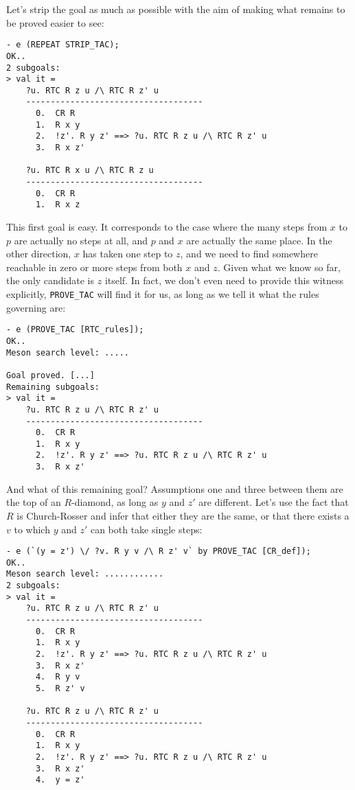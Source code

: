 \documentclass[12pt]{article}
\begin{document}
Let's strip the goal as much as possible with the aim of making what
remains to be proved easier to see:
\begin{session}\begin{verbatim}
- e (REPEAT STRIP_TAC);
OK..
2 subgoals:
> val it =
    ?u. RTC R z u /\ RTC R z' u
    ------------------------------------
      0.  CR R
      1.  R x y
      2.  !z'. R y z' ==> ?u. RTC R z u /\ RTC R z' u
      3.  R x z'

    ?u. RTC R x u /\ RTC R z u
    ------------------------------------
      0.  CR R
      1.  R x z
\end{verbatim}\end{session}
This first goal is easy.  It corresponds to the case where the many
steps from $x$ to $p$ are actually no steps at all, and $p$ and $x$
are actually the same place.  In the other direction, $x$ has taken
one step to $z$, and we need to find somewhere reachable in zero or
more steps from both $x$ and $z$.  Given what we know so far, the only
candidate is $z$ itself.  In fact, we don't even need to provide this
witness explicitly, \texttt{PROVE\_TAC} will find it for us, as long
as we tell it what the rules governing  are:
\begin{session}\begin{verbatim}
- e (PROVE_TAC [RTC_rules]);
OK..
Meson search level: .....

Goal proved. [...]
Remaining subgoals:
> val it =
    ?u. RTC R z u /\ RTC R z' u
    ------------------------------------
      0.  CR R
      1.  R x y
      2.  !z'. R y z' ==> ?u. RTC R z u /\ RTC R z' u
      3.  R x z'
\end{verbatim}\end{session}
    And what of this remaining goal?  Assumptions one and three
    between them are the top of an $R$-diamond, as long as $y$ and
    $z'$ are different.  Let's use the fact that $R$ is Church-Rosser
    and infer that either they are the same, or that there exists a
    $v$ to which $y$ and $z'$ can both take single steps:
\begin{session}\begin{verbatim}
- e (`(y = z') \/ ?v. R y v /\ R z' v` by PROVE_TAC [CR_def]);
OK..
Meson search level: ............
2 subgoals:
> val it =
    ?u. RTC R z u /\ RTC R z' u
    ------------------------------------
      0.  CR R
      1.  R x y
      2.  !z'. R y z' ==> ?u. RTC R z u /\ RTC R z' u
      3.  R x z'
      4.  R y v
      5.  R z' v

    ?u. RTC R z u /\ RTC R z' u
    ------------------------------------
      0.  CR R
      1.  R x y
      2.  !z'. R y z' ==> ?u. RTC R z u /\ RTC R z' u
      3.  R x z'
      4.  y = z'
\end{verbatim}\end{session}
\end{document}
